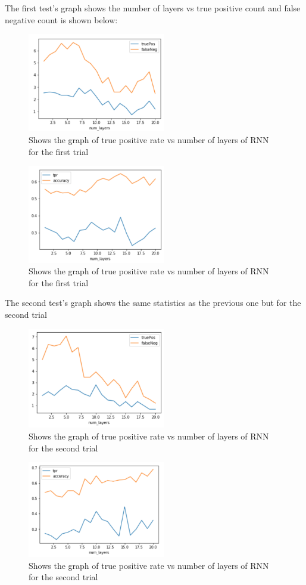 \documentclass[twoside,twocolumn]{article}
\begin{document}
 The first test's graph shows the number of layers vs true positive count and false negative count is shown below:

\begin{figure}[H]
\includegraphics[width=6cm]{rnn_numberLayers_test1}
\caption{Shows the graph of true positive rate vs number of layers of RNN for the first trial}
\centering
\end{figure}

\begin{figure}[H]
\includegraphics[width=6cm]{rnn_numberLayers_test1-tpr}
\caption{Shows the graph of true positive rate vs number of layers of RNN for the first trial}
\centering
\end{figure}

The second test's graph shows the same statistics as the previous one but for the second trial

\begin{figure}[H]
\includegraphics[width=6cm]{rnn_numberLayers_test2}
\caption{Shows the graph of true positive rate vs number of layers of RNN for the second trial}
\centering
\end{figure}
  
\begin{figure}[H]
\includegraphics[width=6cm]{rnn_numberLayers_test2-tpr}
\caption{Shows the graph of true positive rate vs number of layers of RNN for the second trial}
\centering
\end{figure}
\end{document}
